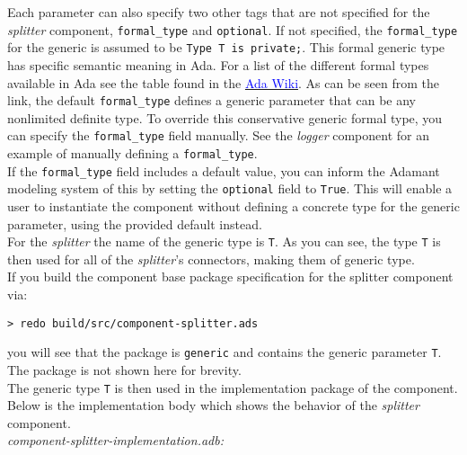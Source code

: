 Each parameter can also specify two other tags that are not specified for the \textit{splitter} component, \texttt{formal\_type} and \texttt{optional}. If not specified, the \texttt{formal\_type} for the generic is assumed to be \texttt{Type T is private;}. This formal generic type has specific semantic meaning in Ada. For a list of the different formal types available in Ada see the table found in the \href{https://en.wikibooks.org/wiki/Ada_Programming/Generics#Generic_formal_types}{\textcolor{blue}{Ada Wiki}}. As can be seen from the link, the default \texttt{formal\_type} defines a generic parameter that can be any nonlimited definite type. To override this conservative generic formal type, you can specify the \texttt{formal\_type} field manually. See the \textit{logger} component for an example of manually defining a \texttt{formal\_type}. \\

If the \texttt{formal\_type} field includes a default value, you can inform the Adamant modeling system of this by setting the \texttt{optional} field to \texttt{True}. This will enable a user to instantiate the component without defining a concrete type for the generic parameter, using the provided default instead. \\

For the \textit{splitter} the name of the generic type is \texttt{T}. As you can see, the type \texttt{T} is then used for all of the \textit{splitter}'s connectors, making them of generic type. \\

If you build the component base package specification for the splitter component via:

\vspace{5mm} %
\begin{verbatim}
> redo build/src/component-splitter.ads
\end{verbatim}
\vspace{5mm} %

you will see that the package is \texttt{generic} and contains the generic parameter \texttt{T}. The package is not shown here for brevity. \\

The generic type \texttt{T} is then used in the implementation package of the component. Below is the implementation body which shows the behavior of the \textit{splitter} component. \\

\textit{component-splitter-implementation.adb:} 

